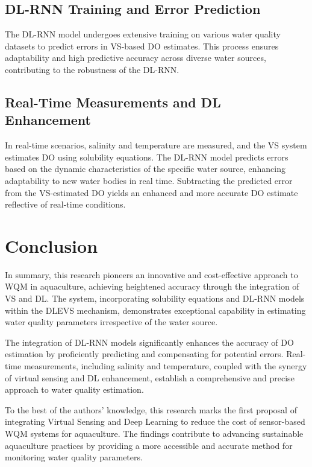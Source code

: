 \documentclass[a4paper, 11pt]{article}
\begin{document}
\subsection*{DL-RNN Training and Error Prediction}
The DL-RNN model undergoes extensive training on various water quality datasets to predict errors in VS-based DO estimates. This process ensures adaptability and high predictive accuracy across diverse water sources, contributing to the robustness of the DL-RNN.

\subsection*{Real-Time Measurements and DL Enhancement}
In real-time scenarios, salinity and temperature are measured, and the VS system estimates DO using solubility equations. The DL-RNN model predicts errors based on the dynamic characteristics of the specific water source, enhancing adaptability to new water bodies in real time. Subtracting the predicted error from the VS-estimated DO yields an enhanced and more accurate DO estimate reflective of real-time conditions.

\section*{Conclusion}
In summary, this research pioneers an innovative and cost-effective approach to WQM in aquaculture, achieving heightened accuracy through the integration of VS and DL. The system, incorporating solubility equations and DL-RNN models within the DLEVS mechanism, demonstrates exceptional capability in estimating water quality parameters irrespective of the water source.

The integration of DL-RNN models significantly enhances the accuracy of DO estimation by proficiently predicting and compensating for potential errors. Real-time measurements, including salinity and temperature, coupled with the synergy of virtual sensing and DL enhancement, establish a comprehensive and precise approach to water quality estimation.

To the best of the authors’ knowledge, this research marks the first proposal of integrating Virtual Sensing and Deep Learning to reduce the cost of sensor-based WQM systems for aquaculture. The findings contribute to advancing sustainable aquaculture practices by providing a more accessible and accurate method for monitoring water quality parameters.

	
	
	
\end{document}
